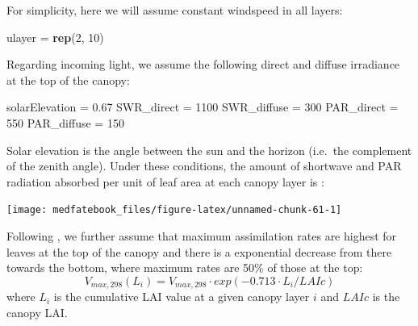 \documentclass[]{book}
\newenvironment{Shaded}{\begin{snugshade}}{\end{snugshade}}
\newcommand{\KeywordTok}[1]{\textcolor[rgb]{0.13,0.29,0.53}{\textbf{#1}}}
\newcommand{\DecValTok}[1]{\textcolor[rgb]{0.00,0.00,0.81}{#1}}
\newcommand{\FloatTok}[1]{\textcolor[rgb]{0.00,0.00,0.81}{#1}}
\newcommand{\StringTok}[1]{\textcolor[rgb]{0.31,0.60,0.02}{#1}}
\newcommand{\NormalTok}[1]{#1}
\begin{document}
For simplicity, here we will assume constant windspeed in all layers:

\begin{Shaded}
\begin{Highlighting}[]
\NormalTok{ulayer =}\StringTok{ }\KeywordTok{rep}\NormalTok{(}\DecValTok{2}\NormalTok{, }\DecValTok{10}\NormalTok{)}
\end{Highlighting}
\end{Shaded}

Regarding incoming light, we assume the following direct and diffuse irradiance at the top of the canopy:

\begin{Shaded}
\begin{Highlighting}[]
\NormalTok{solarElevation =}\StringTok{ }\FloatTok{0.67}
\NormalTok{SWR_direct =}\StringTok{ }\DecValTok{1100}
\NormalTok{SWR_diffuse =}\StringTok{ }\DecValTok{300}
\NormalTok{PAR_direct =}\StringTok{ }\DecValTok{550}
\NormalTok{PAR_diffuse =}\StringTok{ }\DecValTok{150}
\end{Highlighting}
\end{Shaded}

Solar elevation is the angle between the sun and the horizon (i.e.~the complement of the zenith angle). Under these conditions, the amount of shortwave and PAR radiation absorbed per unit of leaf area at each canopy layer is \citep{Anten2016}:

\begin{center}\texttt{[image: medfatebook\_files/figure-latex/unnamed-chunk-61-1]} \end{center}

Following \citet{DePury1997}, we further assume that maximum assimilation rates are highest for leaves at the top of the canopy and there is a exponential decrease from there towards the bottom, where maximum rates are 50\% of those at the top:
\begin{equation}
V_{max,298}(L_i) =V_{max,298}\cdot exp(-0.713\cdot L_i/LAIc)   
\end{equation}
where \(L_i\) is the cumulative LAI value at a given canopy layer \(i\) and \(LAIc\) is the canopy LAI.
\end{document}
